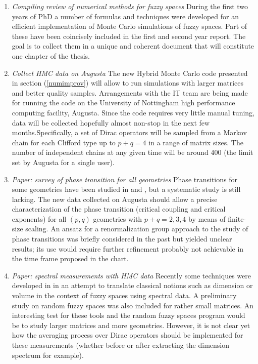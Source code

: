 \begin{enumerate}
\item \textit{Compiling review of numerical methods for fuzzy spaces}\newline
During the first two years of PhD a number of formulas and techniques were developed for an efficient implementation of Monte Carlo simulations of fuzzy spaces. Part of these have been coincisely included in the first and second year report. The goal is to collect them in a unique and coherent document that will constitute one chapter of the thesis.
\item \textit{Collect HMC data on Augusta}\newline
The new Hybrid Monte Carlo code presented in section (\ref{numimprov}) will allow to run simulations with larger matrices and better quality samples. Arrangements with the IT team are being made for running the code on the University of Nottingham high performance computing facility, Augusta. Since the code requires very little manual tuning, data will be collected hopefully almost non-stop in the next few months.\newline Specifically, a set of Dirac operators will be sampled from a Markov chain for each Clifford type up to $p+q=4$ in a range of matrix sizes. The number of independent chains at any given time will be around 400 (the limit set by Augusta for a single user). 
\item \textit{Paper: survey of phase transition for all geometries}\newline
Phase transitions for some geometries have been studied in \cite{barrettglaser} and \cite{glaser}, but a systematic study is still lacking. The new data collected on Augusta should allow a precise characterization of the phase transition (critical coupling and critical exponents) for all $(p,q)$ geometries with $p+q = 2,3,4$ by means of finite-size scaling. An ansatz for a renormalization group approach to the study of phase transitions was briefly considered in the past but yielded unclear results; its use would require further refinement probably not achievable in the time frame proposed in the chart.
\item \textit{Paper: spectral measurements with HMC data}\newline
Recently some techniques were developed in \cite{barrdruceglaser} in an attempt to translate classical notions such as dimension or volume in the context of fuzzy spaces using spectral data. A preliminary study on random fuzzy spaces was also included for rather small matrices. An interesting test for these tools and the random fuzzy spaces program would be to study larger matrices and more geometries. However, it is not clear yet how the averaging process over Dirac operators should be implemented for these measurements (whether before or after extracting the dimension spectrum for example). 

\end{enumerate}

